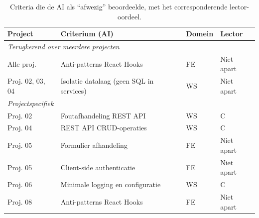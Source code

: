 \documentclass[dutch,dit,thesis]{hogentreport}
\begin{document}
\begin{table}[htbp]
    \centering
    \caption[Analyse afwezig-oordelen]{Criteria die de AI als ``afwezig'' beoordeelde, met het corresponderende lector-oordeel.}
    \label{tab:afwezig-analyse}
    \small
    \begin{tabular}{l l l l}
        \hline
        \textbf{Project} & \textbf{Criterium (AI)} & \textbf{Domein} & \textbf{Lector} \\
        \hline
        \multicolumn{4}{l}{\textit{Terugkerend over meerdere projecten}} \\
        Alle proj. & Anti-patterns React Hooks & FE & Niet apart \\
        Proj. 02, 03, 04 & Isolatie datalaag (geen SQL in services) & WS & Niet apart \\
        \hline
        \multicolumn{4}{l}{\textit{Projectspecifiek}} \\
        Proj. 02 & Foutafhandeling REST API & WS & C \\
        Proj. 04 & REST API CRUD-operaties & WS & C \\
        Proj. 05 & Formulier afhandeling & FE & Niet apart \\
        Proj. 05 & Client-side authenticatie & FE & Niet apart \\
        Proj. 06 & Minimale logging en configuratie & WS & C \\
        Proj. 08 & Anti-patterns React Hooks & FE & Niet apart \\
        \hline
    \end{tabular}
\end{table}


\mainmatter{}












\appendix
\end{document}
